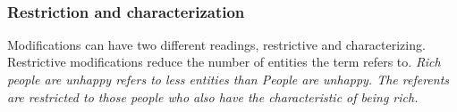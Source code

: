  \\




%
%

\subsubsection{Restriction and characterization}\label{sec:func:Restrictionandcharacterization}
Modifications can have two different readings, restrictive and characterizing. Restrictive modifications reduce the number of entities the term refers to. \em Rich people are unhappy \em refers to less entities than \em People are unhappy\em. The referents are restricted to those people who also have the characteristic of being rich.

